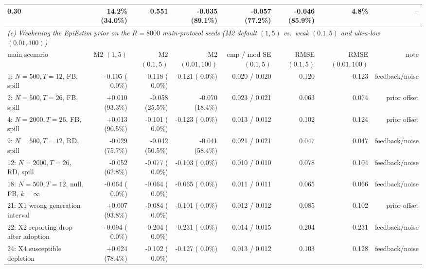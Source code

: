\begin{table}[!t]
\begin{adjustbox}{max width=\linewidth}
\begin{tabular}{lrrrrrrr}
0.30 & 14.2\% (34.0\%) & 0.551 & -0.035 (89.1\%) & -0.057 (77.2\%) & -0.046 (85.9\%) & 4.8\% & -- \\
\midrule
\multicolumn{8}{l}{\emph{(c) Weakening the EpiEstim prior on the $R=8000$ main-protocol seeds (M2 default $(1,5)$ vs.\ weak $(0.1,5)$ and ultra-low $(0.01,100)$)}} \\
main scenario & M2 $(1,5)$ & M2 $(0.1,5)$ & M2 $(0.01,100)$ & emp / mod SE $(0.1,5)$ & RMSE $(0.1,5)$ & RMSE $(0.01,100)$ & note \\
\midrule
1: $N=500, T=12$, FB, spill & -0.105 ( 0.0\%) & -0.118 ( 0.0\%) & -0.121 ( 0.0\%) & 0.020 / 0.020 & 0.120 & 0.123 & feedback/noise \\
2: $N=500, T=26$, FB, spill & +0.010 (93.3\%) & -0.058 (25.5\%) & -0.070 (18.4\%) & 0.023 / 0.021 & 0.063 & 0.074 & prior offset \\
4: $N=2000, T=26$, FB, spill & +0.013 (90.5\%) & -0.101 ( 0.0\%) & -0.123 ( 0.0\%) & 0.013 / 0.012 & 0.102 & 0.124 & prior offset \\
9: $N=500, T=12$, RD, spill & -0.029 (75.7\%) & -0.042 (50.5\%) & -0.041 (58.4\%) & 0.021 / 0.021 & 0.047 & 0.047 & feedback/noise \\
12: $N=2000, T=26$, RD, spill & -0.052 (62.8\%) & -0.077 ( 0.0\%) & -0.103 ( 0.0\%) & 0.010 / 0.010 & 0.078 & 0.104 & feedback/noise \\
18: $N=500, T=12$, null, FB, $k=\infty$ & -0.064 ( 0.0\%) & -0.064 ( 0.0\%) & -0.065 ( 0.0\%) & 0.011 / 0.011 & 0.065 & 0.066 & feedback/noise \\
21: X1 wrong generation interval & +0.007 (93.8\%) & -0.084 ( 0.0\%) & -0.101 ( 0.0\%) & 0.012 / 0.012 & 0.085 & 0.102 & prior offset \\
22: X2 reporting drop after adoption & -0.094 ( 0.0\%) & -0.204 ( 0.0\%) & -0.231 ( 0.0\%) & 0.014 / 0.015 & 0.204 & 0.231 & feedback/noise \\
24: X4 susceptible depletion & +0.024 (78.4\%) & -0.102 ( 0.0\%) & -0.127 ( 0.0\%) & 0.013 / 0.012 & 0.103 & 0.128 & feedback/noise \\
\bottomrule
\end{tabular}
\end{adjustbox}

\end{table}
